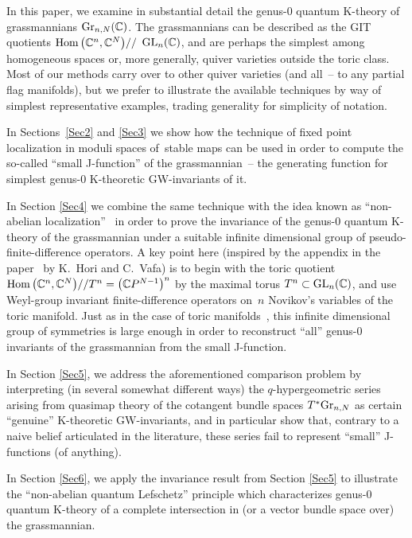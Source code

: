 \documentclass[10pt,a4paper]{amsart}
\numberwithin{equation}{section}
\def\CC{\mathbb C}
\theoremstyle{definition}
\theoremstyle{plain}
\begin{document}
In this paper, we examine in substantial detail the genus-0 quantum K-theory of grass\-mannians ${\rm Gr}_{n,N}(\CC)$. The gras\-sman\-ni\-ans can be described as the GIT quotients $\mathop{\rm Hom} \big(\CC^n,\CC^N\big)//$ ${\rm GL}_n(\CC)$, and are perhaps the simplest among homogeneous spaces or, more generally, quiver varieties outside the toric class. Most of our methods carry over to other quiver varieties (and all~-- to any partial flag manifolds), but we prefer to illustrate the available techniques by way of simplest representative examples, trading generality for simplicity of notation.

In Sections~\ref{Sec2} and \ref{Sec3} we show how the technique of fixed point localization in moduli spaces of~stable maps can be used in order to compute the so-called ``small J-function'' of the grassmannian~-- the generating function for simplest genus-0 K-theoretic GW-invariants of it.

In Section \ref{Sec4} we combine the same technique with the idea known as ``non-abelian localization''~\cite{BCK2} in order to prove the invariance of the genus-0 quantum K-theory of the grassmannian under a suitable infinite dimensional group of pseudo-finite-difference operators. A key point here (inspired by the appendix in the paper~\cite{Hori-Vafa} by K.~Hori and C.~Vafa) is to begin with the toric quotient $\mathop{\rm Hom}\big(\CC^n,\CC^N\big)//T^n=\big(\CC P^{N-1}\big)^n$ by the maximal torus $T^n\subset {\rm GL}_n(\CC)$, and use Weyl-group invariant finite-difference operators on~$n$ Novikov's variables of the toric manifold.
Just as in the case of toric manifolds~\cite{Givental:perm8}, this infinite dimensional group of symmetries is large enough in order to reconstruct ``all'' genus-0 invariants of the grassmannian from the small J-function.

In Section \ref{Sec5}, we address the aforementioned comparison problem by interpreting (in several somewhat different ways) the $q$-hypergeometric series arising from quasimap theory of the cotangent bundle spaces $T^*{\rm Gr}_{n,N}$ as certain ``genuine'' K-theoretic GW-invariants, and in particular show that, contrary to a naive belief articulated in the literature, these series fail to represent ``small'' J-functions (of anything).

In Section \ref{Sec6}, we apply the invariance result from Section \ref{Sec5} to illustrate the ``non-abelian quantum Lefschetz'' principle which characterizes genus-0 quantum K-theory of a complete intersection in (or a vector bundle space over) the grassmannian.
\end{document}
